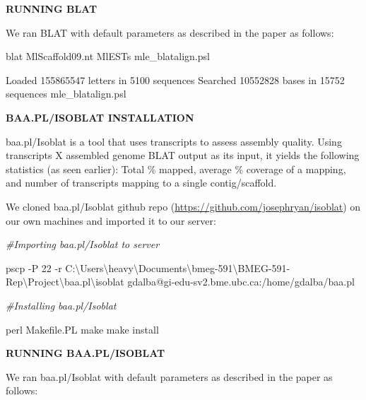 \documentclass[
]{article}
\newenvironment{Shaded}{\begin{snugshade}}{\end{snugshade}}
\newcommand{\CommentTok}[1]{\textcolor[rgb]{0.56,0.35,0.01}{\textit{#1}}}
\newcommand{\ExtensionTok}[1]{#1}
\newcommand{\FunctionTok}[1]{\textcolor[rgb]{0.00,0.00,0.00}{#1}}
\newcommand{\NormalTok}[1]{#1}
\begin{document}
\textbf{RUNNING BLAT}

We ran BLAT with default parameters as described in the paper as
follows:

\begin{Shaded}
\begin{Highlighting}[]

\ExtensionTok{blat}\NormalTok{ MlScaffold09.nt MlESTs mle\_blatalign.psl}

\ExtensionTok{Loaded}\NormalTok{ 155865547 letters in 5100 sequences}
\ExtensionTok{Searched}\NormalTok{ 10552828 bases in 15752 sequences}
\ExtensionTok{mle\_blatalign.psl}
\end{Highlighting}
\end{Shaded}

\textbf{BAA.PL/ISOBLAT INSTALLATION}

baa.pl/Isoblat is a tool that uses transcripts to assess assembly
quality. Using transcripts X assembled genome BLAT output as its input,
it yields the following statistics (as seen earlier): Total \% mapped,
average \% coverage of a mapping, and number of transcripts mapping to a
single contig/scaffold.

We cloned baa.pl/Isoblat github repo
(\url{https://github.com/josephryan/isoblat}) on our own machines and
imported it to our server:

\begin{Shaded}
\begin{Highlighting}[]

\CommentTok{\#Importing baa.pl/Isoblat to server}

\ExtensionTok{pscp}\NormalTok{ {-}P 22 {-}r C:\textbackslash{}Users\textbackslash{}heavy\textbackslash{}Documents\textbackslash{}bmeg{-}591\textbackslash{}BMEG{-}591{-}Rep\textbackslash{}Project\textbackslash{}baa.pl\textbackslash{}isoblat gdalba@gi{-}edu{-}sv2.bme.ubc.ca:/home/gdalba/baa.pl}

\CommentTok{\#Installing baa.pl/Isoblat}

\FunctionTok{perl}\NormalTok{ Makefile.PL}
\FunctionTok{make}
\FunctionTok{make}\NormalTok{ install}
\end{Highlighting}
\end{Shaded}

\textbf{RUNNING BAA.PL/ISOBLAT}

We ran baa.pl/Isoblat with default parameters as described in the paper
as follows:
\end{document}
